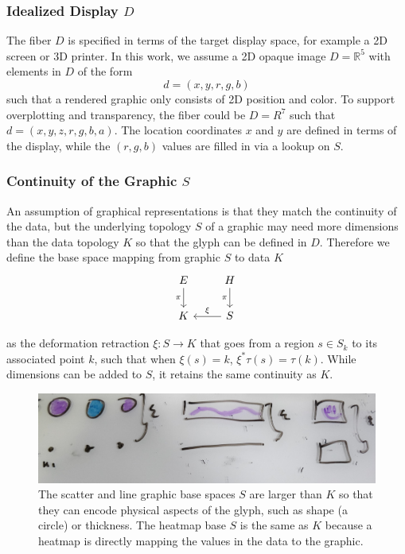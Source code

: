\documentclass[../main.tex]{subfiles}
\begin{document}
\subsubsection{Idealized Display $D$}
\label{sec:graphic_fiber}
The fiber $D$ is specified in terms of the target display space, for example a 2D screen or 3D printer. In this work, we assume a 2D opaque image $D=\mathbb{R}^5$ with elements in $D$ of the form
\begin{equation}
    d = (x, y, r, g, b)
\end{equation}
such that a rendered graphic only consists of 2D position and color. To support overplotting and transparency, the fiber could be $D=R^{7}$ such that $d=(x, y, z, r, g, b, a)$. The location coordinates $x$ and $y$ are defined in terms of the display, while the $(r,g,b)$ values are filled in via a lookup on $S$. 

\subsubsection{Continuity of the Graphic $S$} 
\label{sec:graphic_base}
An assumption of graphical representations is that they match the continuity of the data\cite{tufteVisualDisplayQuantitative2001,friendlyBriefHistoryData2008}, but the underlying topology $S$ of a graphic may need more dimensions than the data topology $K$ so that the glyph can be defined in $D$. Therefore we define the base space mapping from graphic $S$ to data $K$ 
\begin{equation}
    \begin{tikzcd}
        E \arrow[d, "\pi"'] & H \arrow[d, "\pi"'] \\
        K                   & S \arrow[l, "\xi"']
        \end{tikzcd}
\end{equation}

 as the deformation retraction \cite{RetractionTopology2020} $\xi: S \rightarrow K$ that goes from a region $s \in S_{k}$ to its associated point $k$, such that when $\xi(s) = k$, $\xi^*\tau(s) = \tau(k)$. While dimensions can be added to $S$, it retains the same continuity as $K$.
 
\begin{figure}
    \includegraphics[width=1\textwidth]{figures/math/retraction_maps.png}
    \caption{The scatter and line graphic base spaces $S$ are larger than $K$ so that they can encode physical aspects of the glyph, such as shape (a circle) or thickness. The heatmap base $S$ is the same as $K$ because a heatmap is directly mapping the values in the data to the graphic.
    }
    \label{fig:graphic_retraction_map}
\end{figure}
\end{document}
